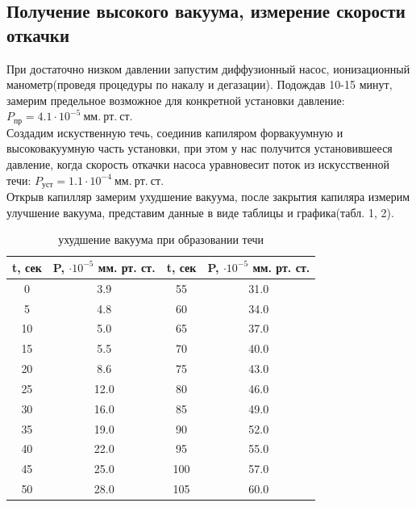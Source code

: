 \documentclass[a4paper, 12pt]{article}%
\begin{document}
\subsection{Получение высокого вакуума, измерение скорости откачки}
При достаточно низком давлении запустим диффузионный насос, ионизационный манометр(проведя процедуры по накалу и дегазации). Подождав 10-15 минут, замерим предельное возможное для конкретной установки давление: $P_{пр}=4.1\cdot10^{-5}~мм.~рт.~ст.$\\
Создадим искуственную течь, соединив капиляром форвакуумную и высоковакуумную часть установки, при этом у нас получится установившееся давление, когда скорость откачки насоса уравновесит поток из искусственной течи: $P_{уст}=1.1\cdot10^{-4}~мм.~рт.~ст.$\\
Открыв капилляр замерим ухудшение вакуума, после закрытия капиляра измерим улучшение вакуума, представим данные в виде таблицы и графика(табл. 1, 2).\\
\begin{table}[H]
	\centering
	\begin{tabular}{|c|c|c|c|}
		\hline
		t, сек & P, $\cdot 10^{-5}$ мм. рт. ст. & t, сек & P, $\cdot 10^{-5}$ мм. рт. ст. \\ \hline
		0      & 3.9                                & 55     & 31.0                               \\ \hline
		5      & 4.8                                & 60     & 34.0                               \\ \hline
		10     & 5.0                                & 65     & 37.0                               \\ \hline
		15     & 5.5                                & 70     & 40.0                               \\ \hline
		20     & 8.6                                & 75     & 43.0                               \\ \hline
		25     & 12.0                               & 80     & 46.0                               \\ \hline
		30     & 16.0                               & 85     & 49.0                               \\ \hline
		35     & 19.0                               & 90     & 52.0                               \\ \hline
		40     & 22.0                               & 95     & 55.0                               \\ \hline
		45     & 25.0                               & 100    & 57.0                               \\ \hline
		50     & 28.0                               & 105    & 60.0                               \\ \hline
	\end{tabular}
	\caption{ухудшение вакуума при образовании течи}
\end{table}
\end{document}

